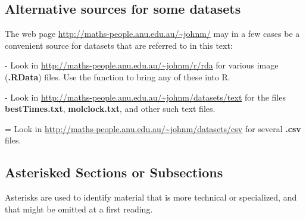 \subsection*{Alternative sources for some datasets}
{\color{gray40}
The web page \url{http://maths-people.anu.edu.au/~johnm/} may in a few cases
be a convenient source for datasets that are referred to in this text:
\begin{itemizz}
\item[-] 
Look in \url{http://maths-people.anu.edu.au/~johnm/r/rda} for
  various image ({\bf .RData}) files.  Use the function  to bring any of these 
  into R.
\item[-] Look in \url{http://maths-people.anu.edu.au/~johnm/datasets/text}
  for the files {\bf bestTimes.txt}, {\bf molclock.txt}, and other such
  text files.
\item[=] Look in \url{http://maths-people.anu.edu.au/~johnm/datasets/csv}
  for several {\bf .csv} files.
\end{itemizz}
\vspace*{-9pt}
}

\subsection*{Asterisked Sections or Subsections}

Asterisks are used to identify material that is more technical or
specialized, and that might be omitted at a first reading.


